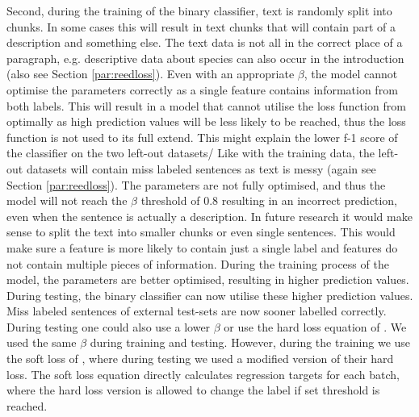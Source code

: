\documentclass[a4paper, 12pt, oneside]{book} %
\begin{document}
Second, during the training of the binary classifier, text is randomly split into chunks. 
In some cases this will result in text chunks that will contain part of a description and something else.
The text data is not all in the correct place of a paragraph, e.g. descriptive data about species can also occur in the introduction (also see Section \ref{par:reedloss}).
Even with an appropriate \(\beta\), the model cannot optimise the parameters correctly as a single feature contains information from both labels.
This will result in a model that cannot utilise the loss function from \textcite{reed_training_2015} optimally as high prediction values will be less likely to be reached, thus the loss function is not used to its full extend.
This might explain the lower f-1 score of the classifier on the two left-out datasets/
Like with the training data, the left-out datasets will contain miss labeled sentences as text is messy (again see Section \ref{par:reedloss}).
The parameters are not fully optimised, and thus the model will not reach the \(\beta\) threshold of 0.8 resulting in an incorrect prediction, even when the sentence is actually a description.
In future research it would make sense to split the text into smaller chunks or even single sentences.
This would make sure a feature is more likely to contain just a single label and features do not contain multiple pieces of information.
During the training process of the model, the parameters are better optimised, resulting in higher prediction values.
During testing, the binary classifier can now utilise these higher prediction values.
Miss labeled sentences of external test-sets are now sooner labelled correctly.
During testing one could also use a lower \(\beta\) or use the hard loss equation of \textcite{reed_training_2015}.
We used the same \(\beta\) during training and testing.
However, during the training we use the soft loss of \textcite{reed_training_2015}, where during testing we used a modified version of their hard loss.
The soft loss equation directly calculates regression targets for each batch, where the hard loss version is allowed to change the label if set threshold is reached.
\end{document}
